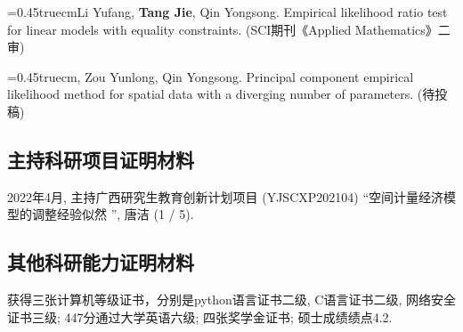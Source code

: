 \documentclass[UFT8]{ctexart}%
\def\nh{\noindent\hangindent=0.45truecm\hangafter=1}
\begin{document}
\nh Li Yufang, { \bfseries Tang Jie}, Qin Yongsong. Empirical likelihood ratio test for linear models with equality constraints. ({\kaishu SCI期刊《Applied Mathematics》二审})

\nh { \bfseries Tang Jie}, Zou Yunlong, Qin Yongsong. Principal component empirical likelihood method for spatial data with a diverging number of parameters. ({\kaishu 待投稿})

\subsection{主持科研项目证明材料}

2022年4月, 主持广西研究生教育创新计划项目 (YJSCXP202104) “空间计量经济模型的调整经验似然 ”, 唐洁 (1 / 5). 

\subsection{其他科研能力证明材料}
获得三张计算机等级证书，分别是python语言证书二级, C语言证书二级, 网络安全证书三级; 447分通过大学英语六级; 四张奖学金证书; 硕士成绩绩点4.2.






%

%



%











\end{document}
